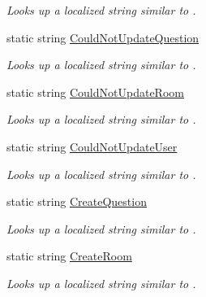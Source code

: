 \begin{DoxyCompactItemize}
\begin{DoxyCompactList}\small\item\em Looks up a localized string similar to . \end{DoxyCompactList}\item 
static string \hyperlink{class_wis_r_1_1_app___resources_1_1_resource_a0d7959a245014e4448fd0cd71d57cfd1}{Could\+Not\+Update\+Question}
\begin{DoxyCompactList}\small\item\em Looks up a localized string similar to . \end{DoxyCompactList}\item 
static string \hyperlink{class_wis_r_1_1_app___resources_1_1_resource_a1473459281c447a8d095129aa234871f}{Could\+Not\+Update\+Room}
\begin{DoxyCompactList}\small\item\em Looks up a localized string similar to . \end{DoxyCompactList}\item 
static string \hyperlink{class_wis_r_1_1_app___resources_1_1_resource_a4692b11da863976e0a3b778a5c13d5d9}{Could\+Not\+Update\+User}
\begin{DoxyCompactList}\small\item\em Looks up a localized string similar to . \end{DoxyCompactList}\item 
static string \hyperlink{class_wis_r_1_1_app___resources_1_1_resource_acf86c9f9699b39109fb929784db9e81a}{Create\+Question}
\begin{DoxyCompactList}\small\item\em Looks up a localized string similar to . \end{DoxyCompactList}\item 
static string \hyperlink{class_wis_r_1_1_app___resources_1_1_resource_ab7dfe17c21508157cebba3ff3fba4b4c}{Create\+Room}
\begin{DoxyCompactList}\small\item\em Looks up a localized string similar to . \end{DoxyCompactList}\item 

\end{DoxyCompactItemize}
